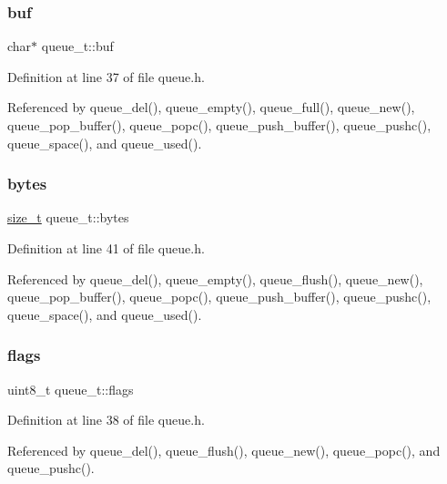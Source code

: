 \subsubsection{\texorpdfstring{buf}{buf}}
{\footnotesize\ttfamily char$\ast$ queue\+\_\+t\+::buf}



Definition at line 37 of file queue.\+h.



Referenced by queue\+\_\+del(), queue\+\_\+empty(), queue\+\_\+full(), queue\+\_\+new(), queue\+\_\+pop\+\_\+buffer(), queue\+\_\+popc(), queue\+\_\+push\+\_\+buffer(), queue\+\_\+pushc(), queue\+\_\+space(), and queue\+\_\+used().

\mbox{\label{structqueue__t_a58398d4ee60bc90ffba2bc3488fe185b}} 
\subsubsection{\texorpdfstring{bytes}{bytes}}
{\footnotesize\ttfamily \hyperlink{user__config_8h_aea0c7eab1ce1eebb4e879ef4e23c16ee}{size\+\_\+t} queue\+\_\+t\+::bytes}



Definition at line 41 of file queue.\+h.



Referenced by queue\+\_\+del(), queue\+\_\+empty(), queue\+\_\+flush(), queue\+\_\+new(), queue\+\_\+pop\+\_\+buffer(), queue\+\_\+popc(), queue\+\_\+push\+\_\+buffer(), queue\+\_\+pushc(), queue\+\_\+space(), and queue\+\_\+used().

\mbox{\label{structqueue__t_a2a516773a572c746d461c9df3cb30387}} 
\subsubsection{\texorpdfstring{flags}{flags}}
{\footnotesize\ttfamily uint8\+\_\+t queue\+\_\+t\+::flags}



Definition at line 38 of file queue.\+h.



Referenced by queue\+\_\+del(), queue\+\_\+flush(), queue\+\_\+new(), queue\+\_\+popc(), and queue\+\_\+pushc().


